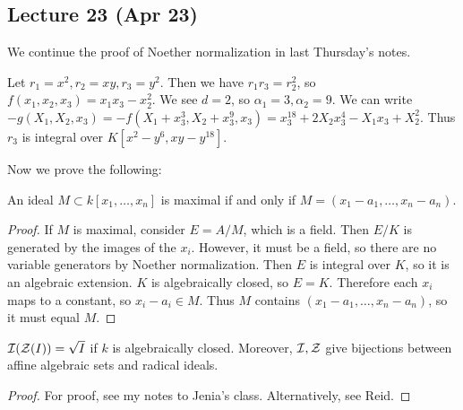 \documentclass[10pt, twoside]{article}
\begin{document}
        \subsection{Lecture 23 (Apr 23)}
        We continue the proof of Noether normalization in last Thursday's notes.
        
        \begin{exm}
            Let $r_1 = x^2,r_2 = xy,r_3=y^2$. Then we have $r_1r_3=r_2^2$, so $f(x_1,x_2,x_3) = x_1x_3-x_2^2$. We see $d=2$, so $\alpha_1 = 3, \alpha_2 = 9$. We can write $-g(X_1,X_2,x_3) = -f(X_1+x_3^3,X_2+x_3^9,x_3) = x_3^{18} + 2X_2x_3^4-X_1x_3+X_2^2$. Thus $r_3$ is integral over $K[x^2-y^6,xy-y^{18}]$.
        \end{exm}

        Now we prove the following:
        \begin{thm}
            An ideal $M \subset k[x_1, \ldots, x_n]$ is maximal if and only if $M = (x_1-a_1, \ldots, x_n-a_n)$.
            \begin{proof}
                If $M$ is maximal, consider $E = A/M$, which is a field. Then $E/K$ is generated by the images of the $x_i$. However, it must be a field, so there are no variable generators by Noether normalization. Then $E$ is integral over $K$, so it is an algebraic extension. $K$ is algebraically closed, so $E = K$. Therefore each $x_i$ maps to a constant, so $x_i-a_i \in M$. Thus $M$ contains $(x_1-a_1, \ldots, x_n-a_n)$, so it must equal $M$.
            \end{proof}
        \end{thm}

        \begin{thm}[Nullstellensatz]
            $\mathcal{I}(\mathcal{Z}(I)) = \sqrt{I}$ if $k$ is algebraically closed. Moreover, $\mathcal{I}, \mathcal{Z}$ give bijections between affine algebraic sets and radical ideals.
            \begin{proof}
                For proof, see my notes to Jenia's class. Alternatively, see Reid.
            \end{proof}
        \end{thm}
\end{document}
